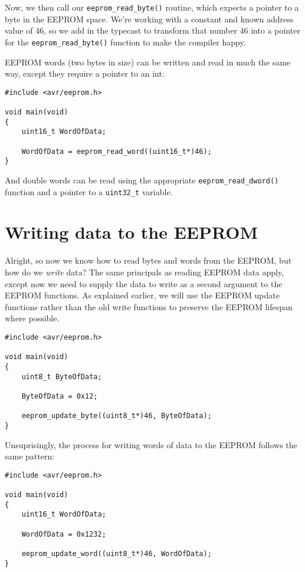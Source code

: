 \documentclass[a4paper,oneside,notitlepage]{book}
\begin{document}
Now, we then call our \lstinline{eeprom_read_byte()} routine, which expects a pointer to a byte in the EEPROM space. We're working with a constant and known address value of 46, so we add in the typecast to transform that number 46 into a pointer for the \lstinline{eeprom_read_byte()} function to make the compiler happy.

EEPROM words (two bytes in size) can be written and read in much the same way, except they require a pointer to an int:

\begin{center}
\begin{lstlisting}
#include <avr/eeprom.h>

void main(void)
{
    uint16_t WordOfData;

    WordOfData = eeprom_read_word((uint16_t*)46);
}
\end{lstlisting}
\end{center}

And double words can be read using the appropriate \lstinline{eeprom_read_dword()} function and a pointer to a \lstinline{uint32_t} variable.

\chapter{Writing data to the EEPROM}

Alright, so now we know how to read bytes and words from the EEPROM, but how do we \textit{write} data? The same principals as reading EEPROM data apply, except now we need to supply the data to write as a second argument to the EEPROM functions. As explained earlier, we will use the EEPROM update functions rather than the old write functions to preserve the EEPROM lifespan where possible.

\begin{center}
\begin{lstlisting}
#include <avr/eeprom.h>

void main(void)
{
    uint8_t ByteOfData;
	
    ByteOfData = 0x12;

    eeprom_update_byte((uint8_t*)46, ByteOfData);
}
\end{lstlisting}
\end{center}

Unsuprisingly, the process for writing words of data to the EEPROM follows the same pattern:

\begin{center}
\begin{lstlisting}
#include <avr/eeprom.h>

void main(void)
{
    uint16_t WordOfData;
	
    WordOfData = 0x1232;

    eeprom_update_word((uint8_t*)46, WordOfData);
}
\end{lstlisting}
\end{center}
\end{document}

